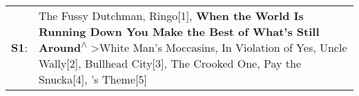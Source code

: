 \begin{supertabular}{p{0.03\textwidth}p{0.92\textwidth}}
 \textbf{S1}:  &  The Fussy Dutchman\textsuperscript{}, \enspace Ringo[1]\textsuperscript{}, \enspace \textbf{When the World Is Running Down You Make the Best of What's Still Around\textsuperscript{$\wedge$}} \textgreater \enspace White Man's Moccasins\textsuperscript{}, \enspace In Violation of Yes\textsuperscript{}, \enspace Uncle Wally[2]\textsuperscript{}, \enspace Bullhead City[3]\textsuperscript{}, \enspace The Crooked One\textsuperscript{}, \enspace Pay the Snucka[4]\textsuperscript{}, 's Theme[5]\textsuperscript{}  \enspace  \\
\end{supertabular}

